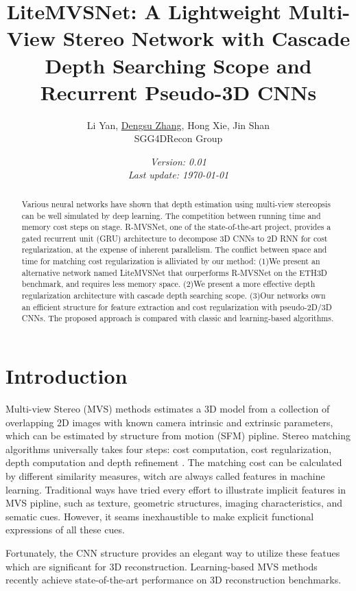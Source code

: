 \documentclass{elegantpaper}
\title{LiteMVSNet: A Lightweight Multi-View Stereo Network with Cascade Depth Searching Scope and Recurrent Pseudo-3D CNNs}
\author{Li Yan, \href{https://fishhe.github.io/}{ Dengsu Zhang}, Hong Xie, Jin Shan \\
		SGG4DRecon Group}
\date{\small\itshape Version: 0.01 \\ Last update: \today}
\begin{document}
\maketitle

\begin{abstract}
	Various neural networks have shown that depth estimation using multi-view stereopsis can be well simulated by deep learning. The competition between running time and memory cost steps on stage. R-MVSNet, one of the state-of-the-art project, provides a gated recurrent unit (GRU) architecture to decompose 3D CNNs to 2D RNN for cost regularization, at the expense of inherent parallelism. The conflict between space and time for matching cost regularization is alliviated by our method: (1)We present an alternative network named LiteMVSNet that ourperforms R-MVSNet on the ETH3D benchmark, and requires less memory space. (2)We present a more effective depth regularization architecture with cascade depth searching scope. (3)Our networks own an efficient structure for feature extraction and cost regularization with pseudo-2D/3D CNNs. The proposed approach is compared with classic and learning-based algorithms.
\end{abstract}

\section{Introduction}
  Multi-view Stereo (MVS) methods estimates a 3D model from a collection of overlapping 2D images with known camera intrinsic and extrinsic parameters, which can be estimated by structure from motion (SFM) pipline. Stereo matching algorithms universally takes four steps: cost computation, cost regularization, depth computation and depth refinement \cite{Scharstein2001}. The matching cost can be calculated by different similarity measures\cite{Chambon2011}\cite{Chang2008}, witch are always called features in machine learning. Traditional ways have tried every effort to illustrate implicit features in MVS pipline, such as texture\cite{leibe_shading-aware_2016}\cite{7350114}, geometric structures\cite{Romanoni2019TAPAMVSTP}\cite{ShujiSAKAI}\cite{Rhemann:2011:FCF:2191740.2191908}, imaging characteristics\cite{Srinivasan2018}\cite{Zhuo:2011:DME:1994015.1994271}, and sematic cues\cite{Xu2015}. However, it seams inexhaustible to make explicit functional expressions of all these cues.

  Fortunately, the CNN structure provides an elegant way to utilize these featues which are significant for 3D reconstruction. Learning-based MVS methods recently achieve state-of-the-art performance on 3D reconstruction benchmarks\cite{jensen2014large}\cite{Knapitsch2017}\cite{schoeps2017cvpr}.
\end{document}
